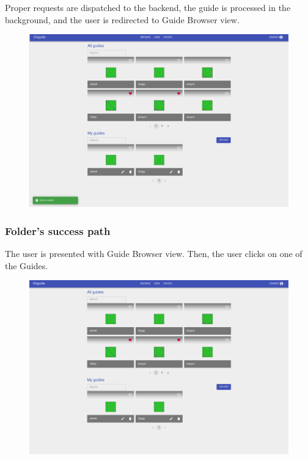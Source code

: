 Proper requests are dispatched to the backend, the guide is processed in the background, and
the user is redirected to Guide Browser view.

\begin{figure}[H]
  	\centering
    \includegraphics[width=\textwidth]{assets/5-designerBrowser.png}
\end{figure}

\subsubsection{Folder's success path}

The user is presented with Guide Browser view. Then, the user clicks on one of the Guides.

\begin{figure}[H]
  	\centering
    \includegraphics[width=\textwidth]{assets/5-folderOpen.png}
\end{figure}

